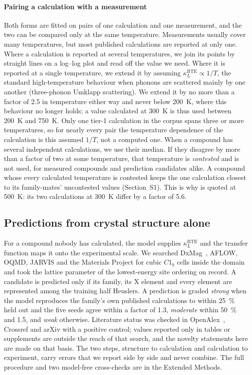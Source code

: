 \paragraph{Pairing a calculation with a measurement} Both forms are fitted on pairs of one calculation and one measurement, and the two can be compared
only at the same temperature. Measurements usually cover many temperatures, but most published
calculations are reported at only one. Where a calculation is reported at several temperatures, we
join its points by straight lines on a log--log plot and read off the value we need. Where it is
reported at a single temperature, we extend it by assuming $\kappa_L^{\mathrm{BTE}} \propto 1/T$, the
standard high-temperature behaviour when phonons are scattered mainly by one another (three-phonon
Umklapp scattering). We extend it by no more than a factor of \num{2.5} in temperature either way and
never below \SI{200}{\kelvin}, where this behaviour no longer holds; a value calculated at
\SI{300}{\kelvin} is thus used between \SI{200}{\kelvin} and \SI{750}{\kelvin}. Only one tier-1
calculation in the corpus spans three or more temperatures, so for nearly every pair the temperature
dependence of the calculation is this assumed $1/T$, not a computed one. When a compound has several
independent calculations, we use their median. If they disagree by more than a factor of two at some
temperature, that temperature is \emph{contested} and is not used, for measured compounds and
prediction candidates alike. A compound whose every calculated temperature is contested keeps the one
calculation closest to its family-mates' uncontested values (Section~S1). This is why  is quoted at \SI{500}{\kelvin}: its two
calculations at \SI{300}{\kelvin} differ by a factor of \num{5.6}.

\subsection{Predictions from crystal structure alone}
\label{sec:structureonly}

For a compound nobody has calculated, the model supplies $\kappa_L^{\mathrm{BTE}}$ and the transfer
function maps it onto the experimental scale. We searched DxMag~\cite{xiao2025highthroug}, AFLOW,
OQMD, JARVIS and the Materials Project for cubic $C1_b$ cells inside the domain and took the lattice
parameter of the lowest-energy site ordering on record. A candidate is predicted only if its family,
its X element and every element are represented among the training half Heuslers. A prediction is
graded \emph{strong} when the model reproduces the family's own published calculations to within
\SI{25}{\percent} held out and the five seeds agree within a factor of \num{1.3}, \emph{moderate}
within \SI{50}{\percent} and \num{1.5}, and \emph{weak} otherwise. Literature status was checked in
OpenAlex~\cite{priem2022openalex}, Crossref and arXiv with a positive control; values reported only
in tables or supplements are outside the reach of that search, and the novelty statements here are
made on that basis. The two steps, structure to calculation and calculation to experiment, carry
errors that we report side by side and never combine. The full procedure and two model-free
cross-checks are in the Extended Methods.

